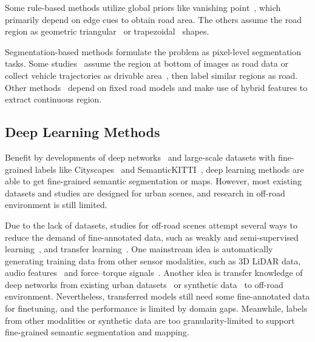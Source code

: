 \documentclass[letterpaper, 10 pt, conference]{ieeeconf}  %
\begin{document}
Some rule-based methods utilize global priors like vanishing point~\cite{kong2009vanishing}\cite{shi2015fast}, which primarily depend on edge cues to obtain road area. The others assume the road region as geometric triangular~\cite{zhou2010self} or trapezoidal~\cite{jeong2002vision} shapes.

Segmentation-based methods formulate the problem as pixel-level segmentation tasks. Some studies~\cite{lu2014hierarchical}
assume the region at bottom of images as road data or collect vehicle trajectories as drivable area~\cite{mei2017scene}, then label similar regions as road.
Other methods~\cite{alon2006off}\cite{wang2009unstructured} depend on fixed road models and make use of hybrid features to extract continuous region.

\subsection{Deep Learning Methods}
Benefit by developments of deep networks~\cite{long2015fully} and large-scale datasets with fine-grained labels like Cityscapes~\cite{cordts2016cityscapes} and SemanticKITTI~\cite{behley2019semantickitti}, deep learning methods are able to get fine-grained semantic segmentation or maps. However, most existing datasets and studies are designed for urban scenes, and research in off-road environment is still limited.

Due to the lack of datasets, studies for off-road scenes attempt several ways to reduce the demand of fine-annotated data, such as weakly and semi-supervised learning~\cite{suger2015traversability}\cite{gao2019off}, and transfer learning~\cite{holder2016road}\cite{sharma2019semantic}. 
One mainstream idea is automatically generating training data from other sensor modalities, such as 3D LiDAR data\cite{tang2017one}\cite{gao2019off}, audio features~\cite{zurn2020self} and force–torque signals~\cite{wellhausen2019should}.
Another idea is transfer knowledge of deep networks from existing urban datasets~\cite{holder2016road} or synthetic data~\cite{sharma2019semantic} to off-road environment.
Nevertheless, transferred models still need some fine-annotated data for finetuning, and the performance is limited by domain gaps. Meanwhile, labels from other modalities or synthetic data are too granularity-limited to support fine-grained semantic segmentation and mapping.
\end{document}
